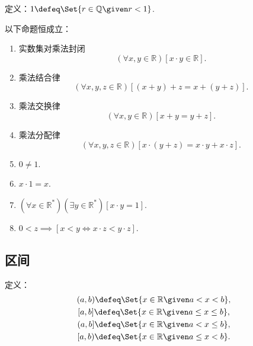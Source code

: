\begin{definition}
定义：\(1\defeq\Set{ r\in\mathbb{Q} \given r < 1 }\).
\end{definition}

\begin{theorem}
以下命题恒成立：
\begin{enumerate}
	\item 实数集对乘法封闭\begin{equation}
		(\forall x,y\in\mathbb{R})[x \cdot y \in \mathbb{R}].
	\end{equation}
	\item 乘法结合律\begin{equation}
		(\forall x,y,z\in\mathbb{R})[(x+y)+z=x+(y+z)].
	\end{equation}
	\item 乘法交换律\begin{equation}
		(\forall x,y\in\mathbb{R})[x+y=y+z].
	\end{equation}
	\item 乘法分配律\begin{equation}
		(\forall x,y,z\in\mathbb{R})[x\cdot(y+z)=x \cdot y+x \cdot z].
	\end{equation}
	\item \(0\neq1\).
	\item \(x\cdot1=x\).
	\item \((\forall x\in\mathbb{R}^*)(\exists y\in\mathbb{R}^*)[x \cdot y=1]\).
	\item \(0<z \implies [x<y \iff x \cdot z<y \cdot z]\).
\end{enumerate}
\end{theorem}

\subsection{区间}
定义：\begin{gather}
	(a,b) \defeq \Set{ x\in\mathbb{R} \given a<x<b }, \\
	[a,b] \defeq \Set{ x\in\mathbb{R} \given a \leq x \leq b }, \\
	(a,b] \defeq \Set{ x\in\mathbb{R} \given a < x \leq b }, \\
	[a,b) \defeq \Set{ x\in\mathbb{R} \given a \leq x < b }.
\end{gather}

